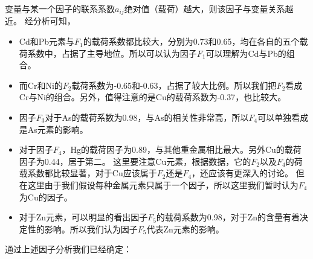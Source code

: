 \documentclass[a4paper]{article}
\begin{document}
变量与某一个因子的联系系数$a_{ij}$绝对值（载荷）越大，则该因子与变量关系越近。
经分析可知，
\begin{itemize}
\item Cd和Pb元素与$F_1$的载荷系数都比较大，分别为0.73和0.65，均在各自的五个载荷系数中，占据了主导地位。所以可以认为因子$F_1$可以理解为Cd与Pb的组合。
\item 而Cr和Ni的$F_2$载荷系数为-0.65和-0.63，占据了较大比例。所以我们把$F_2$看成Cr与Ni的组合。另外，值得注意的是Cu的载荷系数为-0.37，也比较大。
\item 因子$F_3$对于As的载荷系数为0.98，与As的相关性非常高，所以$F_4$可以单独看成是As元素的影响。
\item 对于因子$F_4$，Hg的载荷因子为0.89，与其他重金属相比最大。另外Cu的载荷因子为0.44，居于第二。
这里要注意Cu元素，根据数据，它的$F_2$以及$F_4$的荷载系数都比较显著，对于Cu应该属于$F_2$还是$F_4$，还应该有更深入的讨论。
但在这里由于我们假设每种金属元素只属于一个因子，所以这里我们暂时认为$F_4$为Cu的因子。
\item 对于Zn元素，可以明显的看出因子$F_5$的载荷系数为0.98，对于Zn的含量有着决定性的影响。所以我们认为因子$F_5$代表Zn元素的影响。
\end{itemize}
通过上述因子分析我们已经确定：
\end{document}
